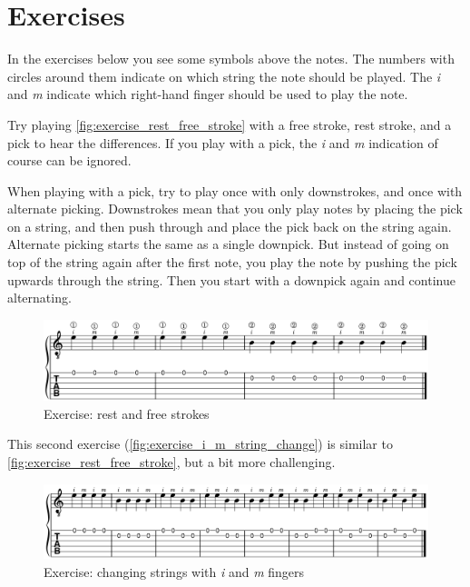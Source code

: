 \section{Exercises}

In the exercises below you see some symbols above the notes. The numbers with circles around them indicate on which string the note should be played. The \textit{i} and \textit{m} indicate which right-hand finger should be used to play the note.

Try playing \autoref{fig:exercise_rest_free_stroke} with a free stroke, rest stroke, and a pick to hear the differences. If you play with a pick, the \textit{i} and \textit{m} indication of course can be ignored.

When playing with a pick, try to play once with only downstrokes, and once with alternate picking. Downstrokes mean that you only play notes by placing the pick on a string, and then push through and place the pick back on the string again. Alternate picking starts the same as a single downpick. But instead of going on top of the string again after the first note, you play the note by pushing the pick upwards through the string. Then you start with a downpick again and continue alternating.

\begin{figure}[h]
    \centering
    \includegraphics[width=\textwidth]{../../MuseScore/Guitar/OpenEnVallendeAanslag.png}
    \caption{Exercise: rest and free strokes}
    \label{fig:exercise_rest_free_stroke}
\end{figure}

This second exercise (\autoref{fig:exercise_i_m_string_change}) is similar to \autoref{fig:exercise_rest_free_stroke}, but a bit more challenging.

\begin{figure}[h]
    \centering
    \includegraphics[width=\textwidth]{../../MuseScore/Guitar/TwoStringAlternating.png}
    \caption{Exercise: changing strings with \textit{i} and \textit{m} fingers}
    \label{fig:exercise_i_m_string_change}
\end{figure}

